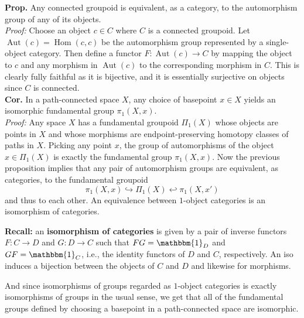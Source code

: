 \documentclass[a4paper]{article}
\theoremstyle{plain}%
\theoremstyle{definition}
\theoremstyle{remark}
\DeclareMathOperator{\Hom}{Hom}
\DeclareMathOperator{\Aut}{Aut}
\begin{document}
\textbf{Prop.} Any connected groupoid is equivalent, as a category, to the
automorphism group of any of its objects.\\
\linebreak
\textit{Proof:} Choose an object $c \in C$ where $C$ is a connected groupoid.
Let
$\Aut(c) = \Hom(c,c)$ be the automorphism group represented by a single-object
category. Then  define a functor
$F  \colon \Aut(c) \to C$ by mapping the object to $c$ and any morphism in
$\Aut(c)$ to the corresponding morphism in $C$. This is clearly fully faithful
as it is bijective, and it is essentially surjective on objects since $C$ is
connected.\\
\linebreak
\textbf{Cor.} In a path-connected space $X$, any choice of basepoint $x \in X$
yields an isomorphic fundamental group $\pi_1 (X,x)$.\\
\linebreak
\textit{Proof:} Any space $X$ has a fundamental groupoid $\Pi_1 (X)$ whose
objects are points in $X$ and whose morphisms are endpoint-preserving homotopy
classes of paths in $X$. Picking any point $x$, the group of automorphisms of
the object $x \in \Pi_1 (X)$ is exactly the fundamental group $\pi_1 (X,x)$.
Now the previous proposition implies that any pair of automorphism groups are
equivalent, as categories, to the fundamental groupoid
\[
\pi_1 (X, x) \hookrightarrow \Pi_1(X) \hookleftarrow \pi_1 (X,x')
\] 
and thus to each other. An equivalence between $1$-object categories is an
isomorphism of categories.\\
\linebreak


\textbf{Recall:} an \textbf{isomorphism of categories} is given by a pair of
inverse functors $F  \colon C \to D$ and $G  \colon D \to C$ such that
$FG = \mathbbm{1}_{D}$ and $GF = \mathbbm{1}_{C}$, i.e., the identity functors
of $D$ and $C$, respectively. An iso induces a bijection between the objects of
$C$ and $D$ and likewise for morphisms.\\
\linebreak

And since isomorphisms of groups regarded as $1$-object categories is exactly
isomorphisms of groups in the usual sense, we get that all of the fundamental
groups defined by choosing a basepoint in a path-connected space are
isomorphic.\\
\linebreak
\end{document}
